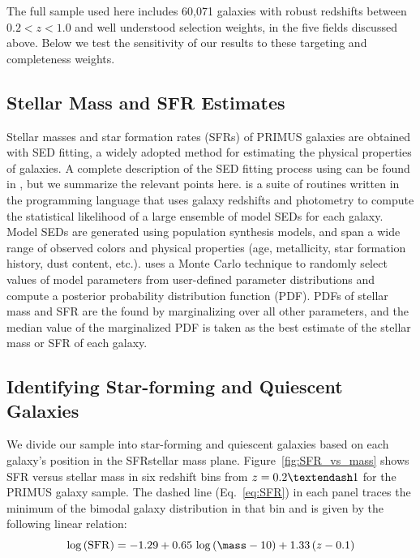 The full sample used here includes 60,071 galaxies with robust redshifts between $0.2<z<1.0$ and well understood selection weights, in the five fields discussed above.
Below we test the sensitivity of our results to these targeting and completeness weights.

\subsection{Stellar Mass and SFR Estimates}\label{sec:SFR}
 
Stellar masses and star formation rates (SFRs) of PRIMUS galaxies are obtained with SED fitting, a widely adopted method for estimating the physical properties of galaxies.
A complete description of the SED fitting process using \iSEDfit can be found in \citet{Moustakas13}, but we summarize the relevant points here.
\iSEDfit is a suite of routines written in the \IDL programming language that uses galaxy redshifts and photometry to compute the statistical likelihood of a large ensemble of model SEDs for each galaxy.
Model SEDs are generated using population synthesis models, and span a wide range of observed colors and physical properties (age, metallicity, star formation history, dust content, etc.).
\iSEDfit uses a Monte Carlo technique to randomly select values of model parameters from user-defined parameter distributions and compute a posterior probability distribution function (PDF).
PDFs of stellar mass and SFR are the found by marginalizing over all other parameters, and the median value of the marginalized PDF is taken as the best estimate of the stellar mass or SFR of each galaxy.

\subsection{Identifying Star-forming and Quiescent Galaxies}\label{sec:SFQ}

We divide our sample into star-forming and quiescent galaxies based on each galaxy's position in the SFR\textendash stellar mass plane. 
Figure~\ref{fig:SFR_vs_mass} shows SFR versus stellar mass in six redshift bins from ${z=0.2\textendash1}$ for the PRIMUS galaxy sample.
The dashed line (Eq.~\ref{eq:SFR}) in each panel traces the minimum of the bimodal galaxy distribution in that bin and is given by the following linear relation:
\begin{equation}\label{eq:SFR}
\log\,({\rm SFR}) = -1.29 + 0.65\,\log\,(\mass - 10) + 1.33\,(z - 0.1)
\end{equation}

